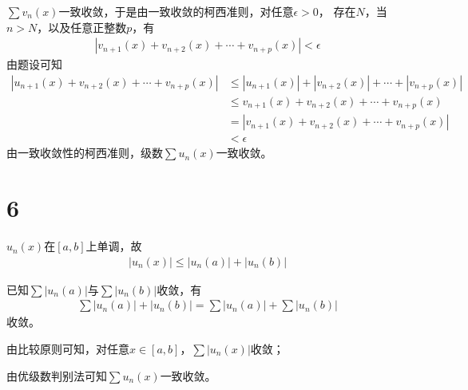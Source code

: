 \documentclass{article}
\begin{document}
$\sum v_n(x)$一致收敛，于是由一致收敛的柯西准则，对任意$\epsilon > 0$，
存在$N$，当$n > N$，以及任意正整数$p$，有
\begin{align*}
  |v_{n+1}(x) + v_{n+2}(x) + \cdots + v_{n+p}(x)| < \epsilon
\end{align*}
由题设可知
\begin{align*}
  |u_{n+1}(x) + v_{n+2}(x) + \cdots + v_{n+p}(x)|
   & \leq |u_{n+1}(x)| + |v_{n+2}(x)| + \cdots + |v_{n+p}(x)| \\
   & \leq v_{n+1}(x) + v_{n+2}(x) + \cdots + v_{n+p}(x)       \\
   & = |v_{n+1}(x) + v_{n+2}(x) + \cdots + v_{n+p}(x)|        \\
   & < \epsilon
\end{align*}
由一致收敛性的柯西准则，级数$\sum u_n(x)$一致收敛。

\section*{6}

$u_n(x)$在$[a,b]$上单调，故
\begin{align*}
  |u_n(x)| \leq |u_n(a)| + |u_n(b)|
\end{align*}

已知$\sum |u_n(a)|$与$\sum |u_n(b)|$收敛，有
\begin{align*}
  \sum |u_n(a)| + |u_n(b)| = \sum |u_n(a)| + \sum |u_n(b)|
\end{align*}
收敛。

由比较原则可知，对任意$x \in [a,b]$，$\sum |u_n(x)|$收敛；

由优级数判别法可知$\sum u_n(x)$一致收敛。
\end{document}
